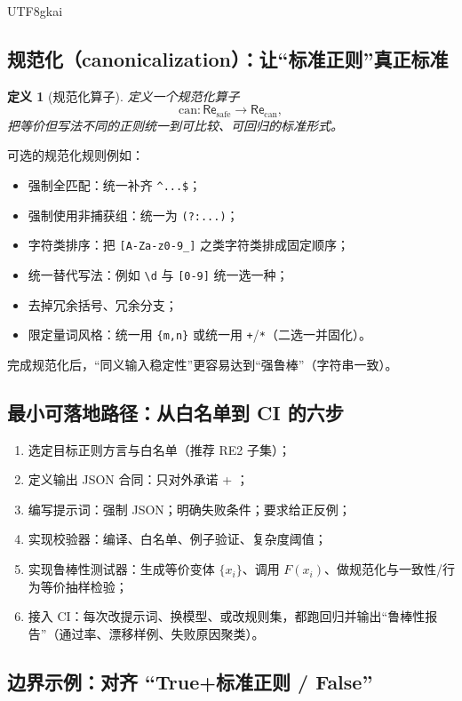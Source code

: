 \documentclass[12pt]{article}
\newtheorem{definition}{定义}[section]
\newcommand{\code}[1]{\path{#1}}
\begin{document}
\begin{CJK*}{UTF8}{gkai}
\subsection{规范化（canonicalization）：让“标准正则”真正标准}
\label{subsec:canonicalization}

\begin{definition}[规范化算子]
定义一个规范化算子
\[
\mathrm{can}:\mathsf{Re}_{\mathrm{safe}}\to \mathsf{Re}_{\mathrm{can}},
\]
把等价但写法不同的正则统一到可比较、可回归的标准形式。
\end{definition}

可选的规范化规则例如：
\begin{itemize}
  \item 强制全匹配：统一补齐 \verb|^...$|；
  \item 强制使用非捕获组：统一为 \verb|(?:...)|；
  \item 字符类排序：把 \verb|[A-Za-z0-9_]| 之类字符类排成固定顺序；
  \item 统一替代写法：例如 \verb|\d| 与 \verb|[0-9]| 统一选一种；
  \item 去掉冗余括号、冗余分支；
  \item 限定量词风格：统一用 \verb|{m,n}| 或统一用 \verb|+|/\verb|*|（二选一并固化）。
\end{itemize}
完成规范化后，“同义输入稳定性”更容易达到“强鲁棒”（字符串一致）。

\subsection{最小可落地路径：从白名单到 CI 的六步}
\label{subsec:minimal-implementation-path}

\begin{enumerate}
  \item 选定目标正则方言与白名单（推荐 \textsf{RE2} 子集）；
  \item 定义输出 JSON 合同：只对外承诺 \code{ok} + \code{regex}；
  \item 编写提示词：强制 JSON；明确失败条件；要求给正反例；
  \item 实现校验器：编译、白名单、例子验证、复杂度阈值；
  \item 实现鲁棒性测试器：生成等价变体 $\{x_i\}$、调用 $F(x_i)$、做规范化与一致性/行为等价抽样检验；
  \item 接入 CI：每次改提示词、换模型、或改规则集，都跑回归并输出“鲁棒性报告”（通过率、漂移样例、失败原因聚类）。
\end{enumerate}

\subsection{边界示例：对齐 “True+标准正则 / False”}
\label{subsec:examples-true-false-boundary}


\end{CJK*}
\end{document}
